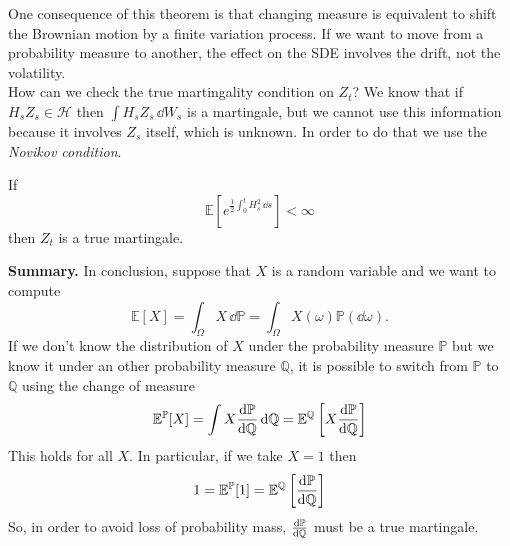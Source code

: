 One consequence of this theorem is that changing measure is equivalent to shift the Brownian motion by a finite variation process. If we want to move from a probability measure to another, the effect on the SDE involves the drift, not the volatility.\\
How can we check the true martingality condition on $Z_t$? We know that if $H_sZ_s\in\mathcal{H}$ then $\int H_sZ_s\,\dd W_s$ is a martingale, but we cannot use this information because it involves $Z_s$ itself, which is unknown. In order to do that we use the \emph{Novikov condition}.
\begin{lemma}
    If
    \begin{equation}
        \mathbb{E}\left[e^{\frac{1}{2}\int^t_0 H_s^2\,\dd s}\right]<\infty
    \end{equation}
    then $Z_t$ is a true martingale.
\end{lemma}
\textbf{Summary.} In conclusion, suppose that $X$ is a random variable and we want to compute
\begin{equation*}
    \mathbb{E}[X] = \int_{\Omega}X\,\dd\mathbb{P} = \int_{\Omega}X(\omega)\mathbb{P}(\dd\omega).
\end{equation*}
If we don't know the distribution of $X$ under the probability measure $\mathbb{P}$ but we know it under an other probability measure $\mathbb{Q}$, it is possible to switch from $\mathbb{P}$ to $\mathbb{Q}$ using the change of measure
\begin{equation*}
    \mathbb{E}^{\mathbb{P}}[X] = \int X\dv{\mathbb{P}}{\mathbb{Q}}\,\dd\mathbb{Q} = \mathbb{E}^{\mathbb{Q}}\left[X\dv{\mathbb{P}}{\mathbb{Q}}\right]
\end{equation*}
This holds for all $X$. In particular, if we take $X=1$ then
\begin{equation*}
    1 = \mathbb{E}^{\mathbb{P}}[1] = \mathbb{E}^{\mathbb{Q}}\left[\dv{\mathbb{P}}{\mathbb{Q}}\right]
\end{equation*}
So, in order to avoid loss of probability mass, $\dv{\mathbb{P}}{\mathbb{Q}}$ must be a true martingale.
